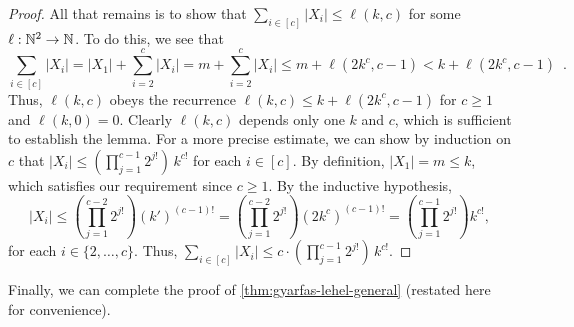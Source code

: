 \documentclass{patmorin}
\begin{document}
\begin{proof}
All that remains is to show that $\sum_{i\in[c]}|X_i|\le\ell(k,c)$ for some $\ell:\mathbb{N}^2\to\mathbb{N}$.  To do this, we see that  
\[
  \sum_{i\in[c]} |X_i| = |X_1| + \sum_{i=2}^{c}|X_i|
 = m + \sum_{i=2}^{c}|X_i|
 \le m + \ell(2k^c,c-1)
 < k + \ell(2k^c,c-1) \enspace .
\]
Thus, $\ell(k,c)$ obeys the recurrence $\ell(k,c)\le k + \ell(2k^c,c-1)$ for $c\ge 1$ and $\ell(k,0)=0$.  Clearly $\ell(k,c)$ depends only one $k$ and $c$, which is sufficient to establish the lemma.  For a more precise estimate, we can show by induction on $c$ that
$|X_i|\le (\prod_{j=1}^{c-1}2^{j!})\, k^{c!}$ for each $i\in[c]$.  
By definition, $|X_1|=m\le k$, which satisfies our requirement since $c\ge 1$.  By the inductive hypothesis,
\[\textstyle
  |X_i|
   \le \left(\prod_{j=1}^{c-2}2^{j!}\right)(k')^{(c-1)!}
   = \left(\prod_{j=1}^{c-2}2^{j!}\right)(2k^c)^{(c-1)!}
   = \left(\prod_{j=1}^{c-1}2^{j!}\right)k^{c!} ,
\]
for each $i\in\{2,\ldots,c\}$.  Thus, $\sum_{i\in[c]}|X_i|\le c\cdot (\prod_{j=1}^{c-1}2^{j!})\, k^{c!}$.
\end{proof}

Finally, we can complete the proof of \cref{thm:gyarfas-lehel-general} (restated here for convenience).
\end{document}

